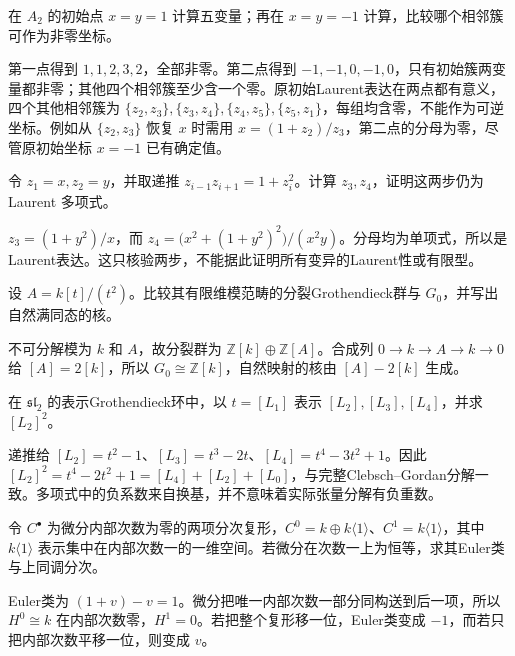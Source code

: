 \begin{exercise}\label{b5:ex:B:08}
	在 \(A_2\) 的初始点 \(x=y=1\) 计算五变量；再在 \(x=y=-1\) 计算，比较哪个相邻簇可作为非零坐标。
\end{exercise}
\begin{solution}
	第一点得到 \(1,1,2,3,2\)，全部非零。第二点得到 \(-1,-1,0,-1,0\)，只有初始簇两变量都非零；其他四个相邻簇至少含一个零。原初始Laurent表达在两点都有意义，四个其他相邻簇为 \(\{z_2,z_3\},\{z_3,z_4\},\{z_4,z_5\},\{z_5,z_1\}\)，每组均含零，不能作为可逆坐标。例如从 \(\{z_2,z_3\}\) 恢复 \(x\) 时需用 \(x=(1+z_2)/z_3\)，第二点的分母为零，尽管原初始坐标 \(x=-1\) 已有确定值。
\end{solution}

\begin{exercise}\label{b5:ex:B:09}
	令 \(z_1=x,z_2=y\)，并取递推 \(z_{i-1}z_{i+1}=1+z_i^2\)。计算 \(z_3,z_4\)，证明这两步仍为 Laurent 多项式。
\end{exercise}
\begin{solution}
	\(z_3=(1+y^2)/x\)，而 \(z_4=\bigl(x^2+(1+y^2)^2\bigr)/(x^2y)\)。分母均为单项式，所以是Laurent表达。这只核验两步，不能据此证明所有变异的Laurent性或有限型。
\end{solution}

\begin{exercise}\label{b5:ex:B:10}
	设 \(A=k[t]/(t^2)\)。比较其有限维模范畴的分裂Grothendieck群与 \(G_0\)，并写出自然满同态的核。
\end{exercise}
\begin{solution}
	不可分解模为 \(k\) 和 \(A\)，故分裂群为 \(\mathbb Z[k]\oplus\mathbb Z[A]\)。合成列 \(0\to k\to A\to k\to0\) 给 \([A]=2[k]\)，所以 \(G_0\cong\mathbb Z[k]\)，自然映射的核由 \([A]-2[k]\) 生成。
\end{solution}

\begin{exercise}\label{b5:ex:B:11}
	在 \(\mathfrak{sl}_2\) 的表示Grothendieck环中，以 \(t=[L_1]\) 表示 \([L_2],[L_3],[L_4]\)，并求 \([L_2]^2\)。
\end{exercise}
\begin{solution}
	递推给 \([L_2]=t^2-1\)、\([L_3]=t^3-2t\)、\([L_4]=t^4-3t^2+1\)。因此 \([L_2]^2=t^4-2t^2+1=[L_4]+[L_2]+[L_0]\)，与完整Clebsch--Gordan分解一致。多项式中的负系数来自换基，并不意味着实际张量分解有负重数。
\end{solution}

\begin{exercise}\label{b5:ex:B:12}
	令 \(C^\bullet\) 为微分内部次数为零的两项分次复形，\(C^0=k\oplus k\langle1\rangle\)、\(C^1=k\langle1\rangle\)，其中 \(k\langle1\rangle\) 表示集中在内部次数一的一维空间。若微分在次数一上为恒等，求其Euler类与上同调分次。
\end{exercise}
\begin{solution}
	Euler类为 \((1+v)-v=1\)。微分把唯一内部次数一部分同构送到后一项，所以 \(H^0\cong k\) 在内部次数零，\(H^1=0\)。若把整个复形移一位，Euler类变成 \(-1\)，而若只把内部次数平移一位，则变成 \(v\)。
\end{solution}


